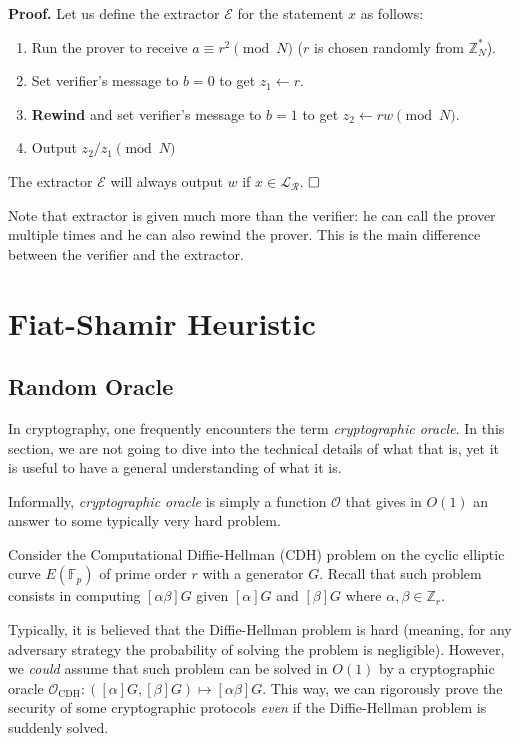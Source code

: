 \documentclass[../lecture-notes.tex]{subfiles}
\begin{document}
\textbf{Proof.} Let us define the extractor $\mathcal{E}$ for the statement $x$ as follows:
\begin{enumerate}
    \item Run the prover to receive $a \equiv r^2 \pmod{N}$ ($r$ is chosen randomly from $\mathbb{Z}_N^*$).
    \item Set verifier's message to $b=0$ to get $z_1 \gets r$.
    \item \textbf{Rewind} and set verifier's message to $b=1$ to get $z_2 \gets rw \pmod{N}$.
    \item Output $z_2/z_1 \pmod{N}$
\end{enumerate}

The extractor $\mathcal{E}$ will always output $w$ if $x \in \mathcal{L}_{\mathcal{R}}$. $\hfill\Box$

\begin{remark}
    Note that extractor is given much more than the verifier: he can call the prover multiple times and he can also rewind the prover. This is the main difference between the verifier and the extractor.    
\end{remark}

\section{Fiat-Shamir Heuristic}

\subsection{Random Oracle}

In cryptography, one frequently encounters the term \textit{cryptographic oracle}. In this section, we are not going to dive into the technical details of what that is, yet it is useful to have a general understanding of what it is.

\begin{definition}
    Informally, \textit{cryptographic oracle} is simply a function $\mathcal{O}$ that gives in $O(1)$ an answer to some typically very hard problem.     
\end{definition}

\begin{example}
    Consider the Computational Diffie-Hellman (CDH) problem on the cyclic elliptic curve $E(\mathbb{F}_p)$ of prime order $r$ with a generator $G$. Recall that such problem consists in computing $[\alpha\beta]G$ given $[\alpha]G$ and $[\beta]G$ where $\alpha,\beta \in \mathbb{Z}_r$. 

    Typically, it is believed that the Diffie-Hellman problem is hard (meaning, for any adversary strategy the probability of solving the problem is negligible). However, we \textit{could} assume that such problem can be solved in $O(1)$ by a cryptographic oracle $\mathcal{O}_{\text{CDH}}: ([\alpha]G,[\beta]G) \mapsto [\alpha\beta]G$. This way, we can rigorously prove the security of some cryptographic protocols \textit{even} if the Diffie-Hellman problem is suddenly solved. 
\end{example}
\end{document}
